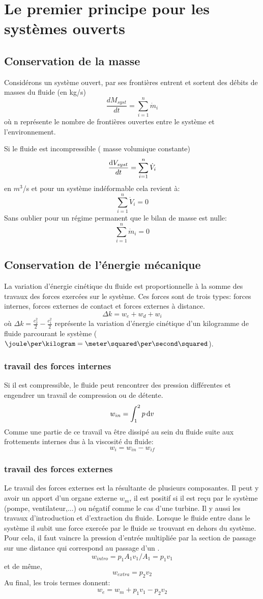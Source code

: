 \section{Le premier principe pour les systèmes ouverts}
\subsection{Conservation de la masse}
Considérons un système ouvert, par ses frontières entrent et
sortent des débits de masses du fluide (en kg/s)
\[ \frac{dM_{syst}}{dt} = \sum_{i = 1}^{n} \dot m_i \]
où n représente le nombre de frontières ouvertes entre
le système et l'environnement.

Si le fluide est incompressible ( masse volumique constante)
\[ \frac{\operatorname{d}\! V_{syst}}{dt} = \sum_{i = 1}^{n}\dot V_i \]
en $m^3$/s et pour un système indéformable cela revient à:
\[  \sum_{i = 1}^n \dot V_i = 0 \]
Sans oublier pour un régime permanent que le bilan de masse est nulle:
\[ \sum_{i = 1}^n \dot m_i = 0 \]

\subsection{Conservation de l'énergie mécanique}
La variation d'énergie cinétique du fluide est proportionnelle à
la somme des travaux des forces exercées sur le système.
Ces forces sont de trois types:  forces internes,
forces externes de contact et forces externes à distance.
\[ \Delta k = w_e +w_d +w_i \]
où $\Delta k = \frac{c_2^2}{2}-\frac{c_1^2}{2}$ représente la variation
d'énergie cinétique d'un kilogramme de fluide parcourant
le système ($\joule\per\kilogram = \meter\squared\per\second\squared$).

\subsubsection{travail des forces internes}
Si il est compressible, le fluide peut rencontrer des pression différentes et
engendrer un travail de compression ou de détente.
\[  w_{in} = \int_1^2 p \operatorname{d}\! v \]
Comme une partie de ce travail va être dissipé au sein du fluide suite aux
frottements internes dus à la viscosité du fluide:
\[  w_i = w_{in}-w_{if} \]

\subsubsection{travail des forces externes}
Le travail des forces externes est la résultante de plusieurs composantes.
Il peut y avoir un apport d'un organe externe $w_m$,
il est positif si il est reçu par le système (pompe, ventilateur,...) ou
négatif comme le cas d'une turbine.
Il y aussi les travaux d'introduction et d'extraction du fluide.
Lorsque le fluide  entre dans le système il subit une force exercée
par le fluide se trouvant en dehors du système.
Pour cela, il faut vaincre la pression d'entrée multipliée par la
section de passage sur une distance qui correspond au passage d'un \kilogram.
\[ w_{intro} = p_1A_1v_1/A_1 = p_1v_1 \]
et de même,
\[ w_{extra} = p_2v_2 \]
Au final, les trois termes donnent:
\[ w_e = w_m +p_1v_1-p_2v_2 \]

